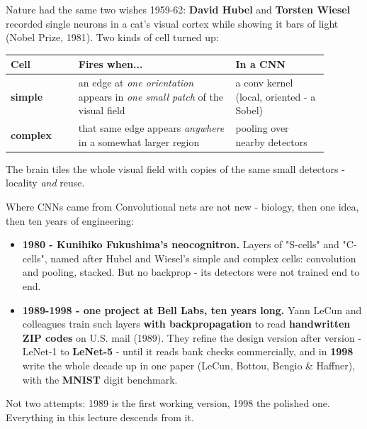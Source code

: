 \documentclass[aspectratio=169]{beamer}
\begin{document}
\begin{frame}{Nature had the same two wishes}
  \small
  1959-62: \textbf{David Hubel} and \textbf{Torsten Wiesel} recorded single neurons in a
  cat's visual cortex while showing it bars of light (Nobel Prize, 1981). Two kinds of
  cell turned up:
  \vskip 6pt
  \begin{center}
    \begin{tabular}{p{0.19\linewidth} p{0.44\linewidth} p{0.26\linewidth}}
      \textbf{Cell} & \textbf{Fires when...} & \textbf{In a CNN}\\
      \hline
      \textbf{simple} & an edge at \emph{one orientation} appears in \emph{one small
        patch} of the visual field & a conv kernel (local, oriented - a Sobel)\\[3pt]
      \textbf{complex} & that same edge appears \emph{anywhere} in a somewhat larger
        region & pooling over nearby detectors\\
    \end{tabular}
  \end{center}
  \vskip 6pt
  The brain tiles the whole visual field with copies of the same small detectors -
  locality \emph{and} reuse.
  \vskip 6pt
\end{frame}

\begin{frame}{Where CNNs came from}
  Convolutional nets are not new - biology, then one idea, then ten years of engineering:
  \vskip 6pt
  \begin{itemize}
    \item \textbf{1980 - Kunihiko Fukushima's neocognitron.} Layers of "S-cells" and
      "C-cells", named after Hubel and Wiesel's simple and complex cells: convolution and
      pooling, stacked. But no backprop - its detectors were not trained end to end.
    \item \textbf{1989-1998 - one project at Bell Labs, ten years long.} Yann LeCun and
      colleagues train such layers \textbf{with backpropagation} to read \textbf{handwritten
      ZIP codes} on U.S. mail (1989). They refine the design version after version - LeNet-1
      to \textbf{LeNet-5} - until it reads bank checks commercially, and in \textbf{1998}
      write the whole decade up in one paper (LeCun, Bottou, Bengio \& Haffner), with the
      \textbf{MNIST} digit benchmark.
  \end{itemize}
  {\small Not two attempts: 1989 is the first working version, 1998 the polished one.
  Everything in this lecture descends from it.}
  \vskip 6pt
\end{frame}
\end{document}
